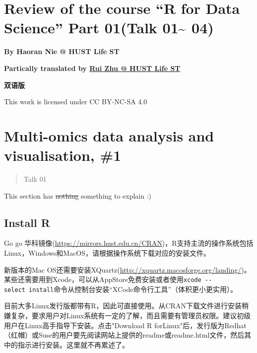 \documentclass[
]{article}
\author{}
\date{}
\begin{document}
\hypertarget{review-of-the-course-r-for-data-science-part-01talk-01-04}{%
\section{Review of the course ``R for Data Science'' Part 01(Talk
01\textasciitilde{}
04)}\label{review-of-the-course-r-for-data-science-part-01talk-01-04}}

\textbf{By Haoran Nie @ HUST Life ST}

\textbf{Partically translated by
\href{https://github.com/1508324011}{Rui Zhu @ HUST Life ST}}

\textbf{双语版}

This work is licensed under CC BY-NC-SA 4.0

\tableofcontents

\newpage
\setcounter{page}{1}
\hypertarget{multi-omics-data-analysis-and-visualisation-1}{%
\section{Multi-omics data analysis and visualisation,
\#1}\label{multi-omics-data-analysis-and-visualisation-1}}

\begin{quote}
Talk 01
\end{quote}

This section has \st{nothing} something to explain :)

\hypertarget{install-r}{%
\subsection{Install R}\label{install-r}}

Go go
{华科镜像}(\url{https://mirrors.hust.edu.cn/CRAN})，R支持主流的操作系统包括Linux，Windows和MacOS，请根据操作系统下载对应的安装文件。

新版本的Mac
OS还需要安装XQuartz(\url{http://xquartz.macosforge.org/landing/})。某些还需要用到Xcode，可以从AppStore免费安装或者使用\texttt{xcode\ -\/-select\ install}命令从控制台安装``XCode命令行工具''（体积更小更实用）。

目前大多Linux发行版都带有R，因此可直接使用。从CRAN下载文件进行安装稍嫌复杂，要求用户对Linux系统有一定的了解，而且需要有管理员权限。建议初级用户在Linux高手指导下安装。点击"Download
R
forLinux"后，发行版为Redhat（红帽）或Suse的用户要先阅读网站上提供的readme或readme.html文件，然后其中的指示进行安装。这里就不再累述了。
\end{document}
